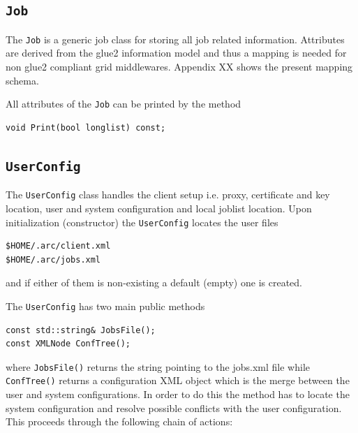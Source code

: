 \documentclass{book}
\newcommand{\Job}{\texttt{Job}}
\newcommand{\UserConfig}{\texttt{UserConfig}}
\begin{document}
\subsection{{\Job}} The {\Job} is a generic job class for storing all job related information. Attributes are derived from the 
glue2 information model and thus a mapping is needed for non glue2 compliant grid middlewares. Appendix XX shows the present 
mapping schema.

All attributes of the {\Job} can be printed by the method

\begin{shaded}
\begin{verbatim}                                                                                                                            
void Print(bool longlist) const;
\end{verbatim}
\end{shaded}

\subsection{{\UserConfig}} The {\UserConfig} class handles the client setup i.e. proxy, certificate and key location, user and system 
configuration and local joblist location. Upon initialization (constructor) the {\UserConfig} locates the user files

\begin{shaded}
\begin{verbatim}                                                                                                                            
$HOME/.arc/client.xml
$HOME/.arc/jobs.xml
\end{verbatim}
\end{shaded}

and if either of them is non-existing a default (empty) one is created.

The {\UserConfig} has two main public methods

\begin{shaded}
\begin{verbatim}
const std::string& JobsFile();
const XMLNode ConfTree();
\end{verbatim}
\end{shaded}

where \texttt{JobsFile()} returns the string pointing to the jobs.xml file while \texttt{ConfTree()}
returns a configuration XML object which is the merge between the user and system configurations.
In order to do this the method has to locate the system configuration and resolve possible conflicts 
with the user configuration. This proceeds through the following chain of actions:
\end{document}
